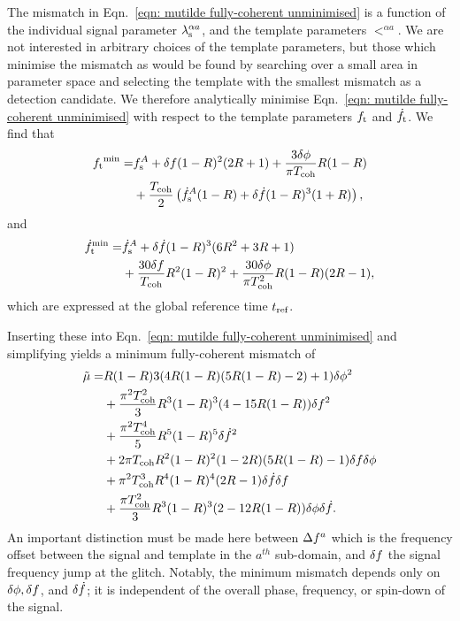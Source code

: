 \documentclass[../full_thesis/full_thesis.tex]{subfiles}
\begin{document}
The mismatch in Eqn.~\eqref{eqn: mutilde fully-coherent unminimised} is a
function of the individual signal parameter ${\lambda}_\textrm{s}^{\alpha a}$, and the template
parameters $\lt^{\alpha a}$. We are not interested in arbitrary choices of the template
parameters, but those which minimise the mismatch as would be found by
searching over a small area in parameter space and selecting the template with
the smallest mismatch as a detection candidate. We therefore
analytically minimise Eqn.~\eqref{eqn: mutilde fully-coherent unminimised} with
respect to the template parameters ${f_{\textrm{t}}}$ and $\dot{f}_{\textrm{t}}$.
We find that
\begin{align}
\begin{split}
{f_{\textrm{t}}}^{\textrm{min}} = &
f_{\textrm{s}}^A + \delta f(1-R)^2(2R+1)
      + \frac{3\delta\phi}{\pi T_{\mathrm{coh}}}R(1-R) \\
& + \frac{T_{\mathrm{coh}}}{2}\left(\dot{f}_{\textrm{s}}^A(1-R)+\delta\dot{f}(1-R)^{3}(1+R)\right),
\end{split}
\end{align}
and
\begin{align}
\begin{split}
\dot{f}_{\textrm{t}}^{\textrm{min}} = &
\dot{f}_{\textrm{s}}^{A} + \delta\dot{f}(1-R)^{3}(6R^{2} + 3R + 1) \\
& + \frac{30\delta f}{T_{\mathrm{coh}}} R^{2}(1-R)^{2} +
\frac{30\delta\phi}{\pi T_{\mathrm{coh}}^{2}} R (1-R)(2R-1),
\end{split}
\end{align}
which are expressed at the global reference time $t_{\textrm{ref}}$.

Inserting these into Eqn.~\eqref{eqn: mutilde fully-coherent unminimised} and
simplifying yields a minimum fully-coherent mismatch of
\begin{align}
\begin{split}
\tilde{\mu} = & R(1-R){3}(4R(1-R)(5R(1-R)-2) + 1)\delta\phi^{2} \\
& + \frac{\pi^{2}T_{\mathrm{coh}}^{2}}{3} R^{3}(1-R)^{3}(4 - 15R(1-R)) \delta f^{2}\\
& + \frac{\pi^{2}T_{\mathrm{coh}}^{4}}{5} R^{5}(1-R)^{5}\delta\dot{f}^{2} \\
& + 2\pi T_{\mathrm{coh}} R^{2}(1-R)^{2}(1-2R)(5R(1-R)-1)\delta f\delta\phi\\
& + \pi^{2} T_{\mathrm{coh}}^{3}R^{4}(1-R)^{4}(2R-1)\delta\dot{f}\delta f \\
& + \frac{\pi T_{\mathrm{coh}}^{2}}{3}R^{3}(1-R)^{3}(2-12R(1-R))\delta\phi\delta\dot{f}.
\end{split}
\label{eqn: mismatch fully-coherent glitch}
\end{align}
An important distinction must be made here between $\Delta f^{a}$ which is the
frequency offset between the signal and template in the $a^{th}$ sub-domain, and $\delta f$
the signal frequency jump at the glitch. Notably, the minimum mismatch
depends only on $\delta\phi, \delta f$, and $\delta\dot{f}$; it is
independent of the overall phase, frequency, or spin-down of the signal.
\end{document}
